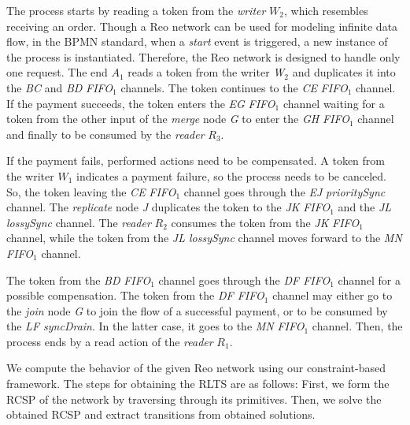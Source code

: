 The process starts by reading a token from the \emph{writer} $W_2$, which resembles receiving an order. Though a Reo network can be used for modeling infinite data flow, in the BPMN standard, when a \emph{start} event is triggered, 
a new instance of the process is instantiated. Therefore, the Reo network is designed to handle only one request. The end $A_1$ reads a token from the writer \emph{W$_2$} and duplicates it into the \emph{BC} and \emph{BD} \emph{FIFO$_1$} channels.
 The token continues to the \emph{CE} \emph{FIFO$_1$} channel. If the payment succeeds, the token enters the \emph{EG} \emph{FIFO$_1$} channel waiting for a token from the other input of the \emph{merge} node \emph{G} to enter the \emph{GH} \emph{FIFO$_1$} channel and finally to be consumed by the \emph{reader} $R_3$.
 
If the payment fails, performed actions need to be compensated. A token from the writer $W_1$ indicates a payment failure, so the process needs to be canceled. So, the token leaving the \emph{CE} \emph{FIFO$_1$} channel goes through the \emph{EJ} \emph{prioritySync} channel. The \emph{replicate} node \emph{J} duplicates the token to the \emph{JK} \emph{FIFO$_1$} and the \emph{JL lossySync} channel. 
 The \emph{reader} $R_2$ consumes the token from the \emph{JK} \emph{FIFO$_1$} channel, while the token from the \emph{JL lossySync} channel moves forward to the \emph{MN FIFO$_1$} channel. %

The token from the \emph{BD} \emph{FIFO$_1$} channel goes through the \emph{DF FIFO$_1$} channel for a possible  compensation. The token from the \emph{DF FIFO$_1$} channel may either go to the \emph{join} node \emph{G} to join the flow of a successful payment, or to be consumed by the \emph{LF syncDrain}. In the latter case, it goes to the \emph{MN} \emph{FIFO$_1$} channel. Then, the process ends by a read action of the \emph{reader} $R_1$.

We compute the behavior of the given Reo network using our constraint-based framework. %
The steps for obtaining the RLTS are as follows: First, we form the RCSP of the network by traversing through its primitives. Then, we solve the obtained RCSP and extract transitions from obtained solutions.%
 
